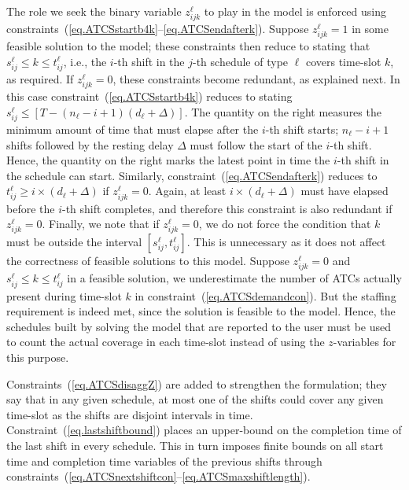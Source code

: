 \documentclass[11pt]{article}
\begin{document}
The role we seek the binary variable $z_{ijk}^\ell$ to play in the model is enforced using constraints~(\ref{eq.ATCSstartb4k}--\ref{eq.ATCSendafterk}). Suppose $z_{ijk}^\ell = 1$ in some feasible solution to the model; these constraints then reduce to stating that $s_{ij}^\ell \le k \le t_{ij}^\ell$, i.e., the $i$-th shift in the $j$-th schedule of type $\ell$ covers time-slot $k$, as required. If $z_{ijk}^\ell = 0$, these constraints become redundant, as explained next. In this case constraint~(\ref{eq.ATCSstartb4k}) reduces to stating $s_{ij}^\ell \le  [T-(n_\ell-i+1)(d_\ell + \Delta)]$. The quantity on the right measures the minimum amount of time that must elapse after the $i$-th shift starts; $n_\ell-i+1$ shifts followed by the resting delay $\Delta$ must follow the start of the $i$-th shift. Hence, the quantity on the right marks the latest point in time the $i$-th shift in the schedule can start. Similarly, constraint~(\ref{eq.ATCSendafterk}) reduces to $t_{ij}^\ell \ge i\times(d_\ell+\Delta)$ if $z_{ijk}^\ell = 0$. Again, at least $ i\times(d_\ell+\Delta)$ must have elapsed before the $i$-th shift completes, and therefore this constraint is also redundant if  $z_{ijk}^\ell = 0$. Finally, we note that if  $z_{ijk}^\ell = 0$, we do not force the condition that $k$ must be outside the interval $[s_{ij}^\ell,t_{ij}^\ell]$. This is unnecessary as it does not affect the correctness of feasible solutions to this model. Suppose $z_{ijk}^\ell = 0$ and $s_{ij}^\ell \le k \le t_{ij}^\ell$ in a feasible solution, we  underestimate the number of ATCs actually present during time-slot $k$ in constraint~(\ref{eq.ATCSdemandcon}). But the staffing requirement is indeed met, since the solution is feasible to the model. Hence, the schedules built by solving the model that are reported to the user must be used to count the actual coverage in each time-slot instead of using the $z$-variables for this purpose. 

Constraints~(\ref{eq.ATCSdisaggZ}) are added to strengthen the formulation; they say that in any given schedule, at most one of the shifts could cover any given time-slot as the shifts are disjoint intervals in time. 
Constraint~(\ref{eq.lastshiftbound}) places an upper-bound on the completion time of the last shift in every schedule. This in turn imposes finite bounds on all start time and completion time variables of the previous shifts through constraints~(\ref{eq.ATCSnextshiftcon}--\ref{eq.ATCSmaxshiftlength}).

%    
%    
%
\end{document}
